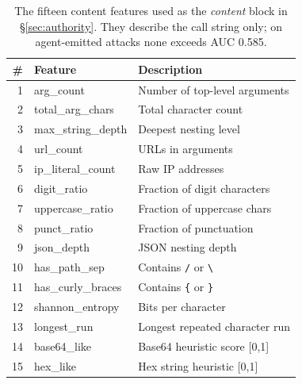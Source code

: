 \documentclass[sigconf,nonacm]{acmart}
\begin{document}
\begin{table}[t]
\centering
\footnotesize
\caption{The fifteen content features used as the \emph{content} block in \S\ref{sec:authority}. They describe the call string only; on agent-emitted attacks none exceeds AUC 0.585.}
\vspace{-0.1in}
\label{tab:features}
\setlength{\tabcolsep}{3pt}
\begin{tabular}{rll}
\toprule
\# & Feature & Description \\
\midrule
1 & arg\_count & Number of top-level arguments \\
2 & total\_arg\_chars & Total character count \\
3 & max\_string\_depth & Deepest nesting level \\
4 & url\_count & URLs in arguments \\
5 & ip\_literal\_count & Raw IP addresses \\
6 & digit\_ratio & Fraction of digit characters \\
7 & uppercase\_ratio & Fraction of uppercase chars \\
8 & punct\_ratio & Fraction of punctuation \\
9 & json\_depth & JSON nesting depth \\
10 & has\_path\_sep & Contains \texttt{/} or \texttt{\textbackslash} \\
11 & has\_curly\_braces & Contains \texttt{\{} or \texttt{\}} \\
12 & shannon\_entropy & Bits per character \\
13 & longest\_run & Longest repeated character run \\
14 & base64\_like & Base64 heuristic score [0,1] \\
15 & hex\_like & Hex string heuristic [0,1] \\
\bottomrule
\end{tabular}
\vspace{-0.15in}
\end{table}
\end{document}
